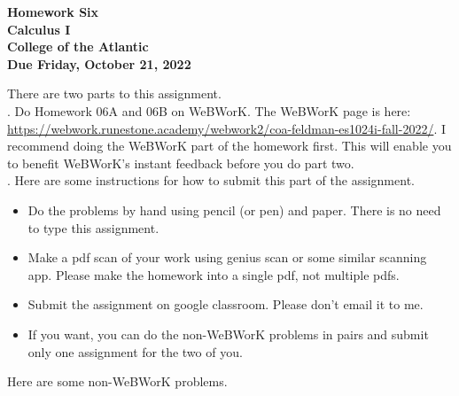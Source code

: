 \documentclass[12pt]{article}
\begin{document}
\pagestyle{empty}
 
\begin{center}
{\LARGE {\bf Homework Six}}\\
\bigskip
{\Large {\bf Calculus I}}\\
\bigskip
{\Large {\bf College of the Atlantic}}\\
\bigskip
{ {\bf Due Friday, October 21, 2022}}\\ 
\end{center}
\medskip


\noindent There are two parts to this assignment.\\

.  Do Homework 06A and 06B on
WeBWorK.  The WeBWorK page is here: 
\url{https://webwork.runestone.academy/webwork2/coa-feldman-es1024i-fall-2022/}.
I recommend doing the WeBWorK part of the homework first.  This will
enable you to benefit WeBWorK's instant feedback before you do part
two.\\ 


.  Here are some
instructions for how to submit this part of the assignment.
\begin{itemize}
  \setlength{\itemsep}{0mm}
\item Do the problems by hand using pencil (or pen) and paper.
  There is no need to type this assignment.
\item Make a pdf scan of your work using genius scan or some
  similar scanning app.  Please make the homework into a single
  pdf, not multiple pdfs.
\item Submit the assignment on google classroom.  Please don't
  email it to me.
\item If you want, you can do the non-WeBWorK problems in pairs and
  submit only one assignment for the two of you. \\
\end{itemize}

\noindent Here are some non-WeBWorK problems.\\
\end{document}
